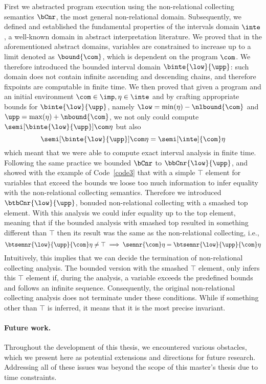 First we abstracted program execution using the non-relational
collecting semantics \(\bCnr\), the most general non-relational
domain. Subsequently, we defined and established the fundamental
properties of the intervals domain \(\inte\), a well-known domain in
abstract interpretation literature. We proved that in the
aforementioned abstract domains, variables are constrained to increase
up to a limit denoted as \(\bound{\com}\), which is dependent on the
program \(\com\). We therefore introduced the bounded interval domain
\(\binte{\low}{\upp}\): such domain does not contain infinite
ascending and descending chains, and therefore fixpoints are
computable in finite time. We then proved that given a program and an
initial environment \(\com\in\imp, \eta\in\inte\) and by crafting
appropriate bounds for \(\binte{\low}{\upp}\), namely
\(\low = \min(\eta) - \nlbound{\com}\) and
\(\upp = \max(\eta) + \nbound{\com}\), we not only could compute
\(\semi[\binte{\low}{\upp}]{\com}\eta\) but
also \[\semi[\binte{\low}{\upp}]{\com}\eta = \semi[\inte]{\com}\eta\]
which meant that we were able to compute exact interval analysis in
finite time. Following the same practice we bounded \(\bCnr\) to
\(\bbCnr{\low}{\upp}\), and showed with the example of
Code~\ref{code3} that with a simple \(\top\) element for variables
that exceed the bounds we loose too much information to infer equality
with the non-relational collecting semantics.  Therefore we introduced
\(\btbCnr{\low}{\upp}\), bonuded non-relational collecting with a
smashed top element. With this analysis we could infer equality up to
the top element, meaning that if the bounded analysis with smashed top
resulted in something different than \(\top\) then its result was the
same as the non-relational collecting, i.e.,
\[\btsemnr{\low}{\upp}{\com}\eta \neq \top \implies \semnr{\com}\eta =
  \btsemnr{\low}{\upp}{\com}\eta\] Intuitively, this implies that we
can decide the termination of non-relational collecting analysis. The
bounded version with the smashed \(\top\) element, only infers this
\(\top\) element if, during the analysis, a variable exceeds the
predefined bounds and follows an infinite sequence. Consequently, the
original non-relational collecting analysis does not terminate under
these conditions. While if something other than \(\top\) is inferred,
it means that it is the most precise invariant.

\paragraph*{Future work.}
Throughout the development of this thesis, we encountered various
obstacles, which we present here as potential extensions and
directions for future research. Addressing all of these issues was
beyond the scope of this master's thesis due to time constraints.

